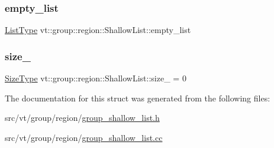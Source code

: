 \mbox{\label{structvt_1_1group_1_1region_1_1_shallow_list_a49f2adbe2bda0e5d175c77df789f96b4}} 
\subsubsection{\texorpdfstring{empty\+\_\+list}{empty\_list}}
{\footnotesize\ttfamily \hyperlink{structvt_1_1group_1_1region_1_1_region_a4e35b2fc6dca06aca0b7bc0e19b35c5a}{List\+Type} vt\+::group\+::region\+::\+Shallow\+List\+::empty\+\_\+list\hspace{0.3cm}{\ttfamily [private]}}

\mbox{\label{structvt_1_1group_1_1region_1_1_shallow_list_a86ed6a2eab4b32509f9eeacb315b8a68}} 
\subsubsection{\texorpdfstring{size\+\_\+}{size\_}}
{\footnotesize\ttfamily \hyperlink{structvt_1_1group_1_1region_1_1_region_a9bb381adf31111aae34dbc644bad6c1f}{Size\+Type} vt\+::group\+::region\+::\+Shallow\+List\+::size\+\_\+ = 0\hspace{0.3cm}{\ttfamily [private]}}



The documentation for this struct was generated from the following files\+:\begin{DoxyCompactItemize}
\item 
src/vt/group/region/\hyperlink{group__shallow__list_8h}{group\+\_\+shallow\+\_\+list.\+h}\item 
src/vt/group/region/\hyperlink{group__shallow__list_8cc}{group\+\_\+shallow\+\_\+list.\+cc}\end{DoxyCompactItemize}
